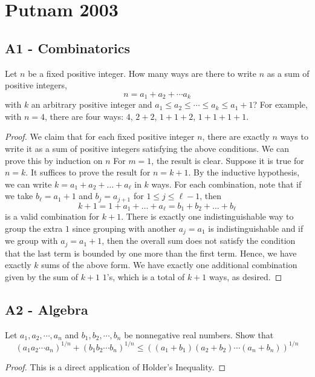 \documentclass[11pt]{scrartcl}
\newcommand{\<}{\langle}
\renewcommand{\>}{\rangle}
\begin{document}
\pagebreak

\section{Putnam 2003}
\subsection{A1 - Combinatorics}
Let $n$ be a fixed positive integer. How many ways are there to write $n$ as a sum of positive integers,
\[n = a_1 + a_2 + \cdots a_k\]with $k$ an arbitrary positive integer and $a_1 \le a_2 \le \cdots \le a_k \le a_1 + 1$? For example, with $n = 4$, there are four ways: $4$, $2 + 2$, $1 + 1 + 2$, $1 + 1 + 1 + 1$.
\begin{proof}
We claim that for each fixed positive integer $n$, there are exactly $n$ ways to write it as a sum of positive integers satisfying the above conditions.  We can prove this by induction on $n$  For $m = 1$, the result is clear.  Suppose it is true for $n = k$.  It suffices to prove the result for $n = k+1$.  By the inductive hypothesis, we can write $k = a_1 + a_2 + \dots + a_{\ell}$ in $k$ ways.  For each combination, note that if we take $b_\ell =  a_1 + 1$ and $b_j = a_{j+1}$ for $1 \le j \le \ell-1$, then 
$$k+1 = 1 + a_1 + \dots + a_\ell = b_1 + b_2 + \dots + b_{\ell}$$
is a valid combination for $k+1$.  There is exactly one indistinguishable way to group the extra $1$ since grouping with another $a_j = a_1$ is indistinguishable and if we group with $a_j = a_1 + 1$, then the overall sum does not satisfy the condition that the last term is bounded by one more than the first term.  Hence, we have exactly $k$ sums of the above form.  We have exactly one additional combination given by the sum of $k+1$ $1$'s, which is a total of $k+1$ ways, as desired.  

\end{proof}
\subsection{A2 - Algebra}
Let $a_1, a_2, \cdots , a_n$ and $b_1, b_2,\cdots, b_n$ be nonnegative real numbers. Show that\[(a_1a_2 \cdots a_n)^{1/n}+ (b_1b_2 \cdots b_n)^{1/n} \le ((a_1 + b_1)(a_2 + b_2) \cdots (a_n + b_n))^{1/n}\]
\begin{proof}
This is a direct application of Holder's Inequality.  
\end{proof}
\end{document}
